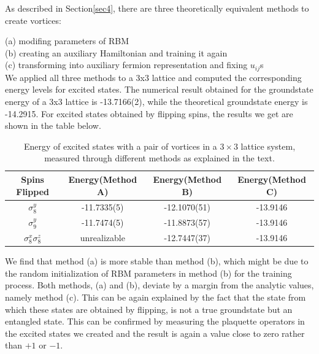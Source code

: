 \documentclass{article}
\begin{document}
As described in Section\hspace{0.2mm}\ref{sec4}, there are three theoretically equivalent methods to create vortices:

    (a) modifing parameters of RBM \\
    (b) creating an auxiliary Hamiltonian and training it again \\
    (c) transforming into auxiliary fermion representation and fixing $u_{ij}$s \cite{Kitaev_2003,pachos_2012} \\
    
We applied all three methods to a 3x3 lattice and computed the corresponding energy levels for excited states. The numerical result obtained for the groundstate energy of a 3x3 lattice is -13.7166(2), while the theoretical groundstate energy is -14.2915. For excited states obtained by flipping spins, the results we get are shown in the table below.

\begin{table}[!htb]
	\centering
	{
    \begin{tabular}{|c||c|c|c|}
    \hline
    Spins Flipped&Energy(Method A)&Energy(Method B)&Energy(Method C)\\
    \hline \hline
    $\sigma_8^y$&-11.7335(5) &-12.1070(51)&-13.9146\\
    \hline
    $\sigma_9^y$&-11.7474(5) &-11.8873(57)&-13.9146\\
    \hline
    $\sigma_8^x\sigma_8^z$&unrealizable&-12.7447(37)&-13.9146\\
    \hline
    \end{tabular}}
	\vspace{2mm}
	\caption{\label{tab:3x3} Energy of excited states with a pair of vortices in a $3 \times 3$ lattice system, measured through different methods as explained in the text.} 
\end{table}

We find that method (a) is more stable than method (b), which might be due to the random initialization of RBM parameters in method (b) for the training process. Both methods, (a) and (b), deviate by a margin from the analytic values, namely method (c). This can be again explained by the fact that the state from which these states are obtained by flipping, is not a true groundstate but an entangled state. This can be confirmed by measuring the plaquette operators in the excited states we created and the result is again a value close to zero rather than $+1$ or $-1$.
\end{document}

